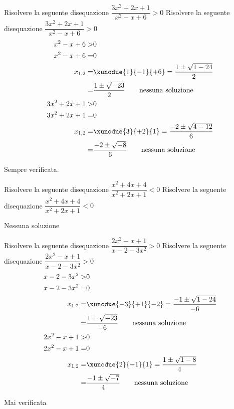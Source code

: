 \begin{exercise}
		Risolvere la seguente disequazione $\dfrac{3x^2+2x+1}{x^2-x+6}> 0$
\tcblower
Risolvere la seguente disequazione $\dfrac{3x^2+2x+1}{x^2-x+6}> 0$
\begin{align*}
x^2-x+6>&0\\
x^2-x+6=&0\\
x_{1,2}=&\xunodue{1}{-1}{+6}=\dfrac{1\pm\sqrt{1-24}}{2}\\
=&\dfrac{1\pm\sqrt{-23}}{2}
\qquad\text{nessuna soluzione}\\
3x^2+2x+1>&0\\
3x^2+2x+1=&0\\
x_{1,2}=&\xunodue{3}{+2}{1}=\dfrac{-2\pm\sqrt{4-12}}{6}\\
=&\dfrac{-2\pm\sqrt{-8}}{6}
\qquad\text{nessuna soluzione}\\
\end{align*}
\begin{center}
	
\end{center}
Sempre verificata.
\end{exercise}
\begin{exercise}
		Risolvere la seguente disequazione $\dfrac{x^2+4x+4}{x^2+2x+1}< 0$
		\tcblower
Risolvere la seguente disequazione $\dfrac{x^2+4x+4}{x^2+2x+1}< 0$

Nessuna soluzione
\end{exercise}
\begin{exercise}
		Risolvere la seguente disequazione $\dfrac{2x^2-x+1}{x-2-3x^2}> 0$
	\tcblower
		Risolvere la seguente disequazione $\dfrac{2x^2-x+1}{x-2-3x^2}> 0$
	\begin{align*}
	x-2-3x^2>&0\\
	x-2-3x^2=&0\\
	x_{1,2}=&\xunodue{-3}{+1}{-2}=\dfrac{-1\pm\sqrt{1-24}}{-6}\\
	=&\dfrac{1\pm\sqrt{-23}}{-6}
	\qquad\text{nessuna soluzione}\\
	2x^2-x+1>&0\\
	2x^2-x+1=&0\\
	x_{1,2}=&\xunodue{2}{-1}{1}=\dfrac{1\pm\sqrt{1-8}}{4}\\
	=&\dfrac{-1\pm\sqrt{-7}}{4}
	\qquad\text{nessuna soluzione}\\
	\end{align*}
	\begin{center}
		
	\end{center}
Mai verificata
\end{exercise}
